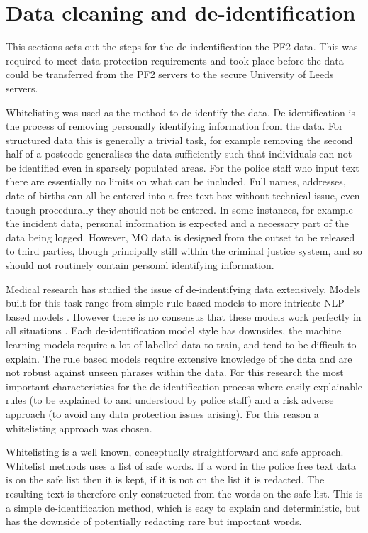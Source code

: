 \section{Data cleaning and de-identification} This sections sets out the steps for the de-indentification the PF2 data.  This was required to meet data protection requirements and took place before the data could be transferred from the PF2 servers to the secure University of Leeds servers.

Whitelisting was used as the method to de-identify the data. De-identification is the process of removing personally identifying information from the data. For structured data this is generally a trivial task, for example removing the second half of a postcode generalises the data sufficiently such that individuals can not be identified even in sparsely populated areas. For the police staff who input text there are essentially no limits on what can be included.  Full names, addresses, date of births can all be entered into a free text box without technical issue, even though procedurally they should not be entered. In some instances, for example the incident data, personal information is expected and a necessary part of the data being logged. However, MO data is designed from the outset to be released to third parties, though principally still within the criminal justice system, and so should not routinely contain personal identifying information.

Medical research has studied the issue of de-indentifying data extensively. Models built for this task range from simple rule based models to more intricate NLP based models \parencite{meystre2010automatic}. However there is no consensus that these models work perfectly in all situations \parencite{narayanan2014no}. Each de-identification model style has downsides, the machine learning models require a lot of labelled data to train, and tend to be difficult to explain. The rule based models require extensive knowledge of the data and are not robust against unseen phrases within the data. For this research the most important characteristics for the de-identification process where easily explainable rules (to be explained to and understood by police staff) and a risk adverse approach (to avoid any data protection issues arising). For this reason a whitelisting approach was chosen.

Whitelisting is a well known, conceptually straightforward and safe approach. Whitelist methods uses a list of safe words. If a word in the police free text data is  on the safe list then it is kept, if it is not on the list it is redacted. The resulting text is therefore only constructed from the words on the safe list. This is a simple de-identification method, which is easy to explain and deterministic, but has the downside of potentially redacting rare but important words. 

